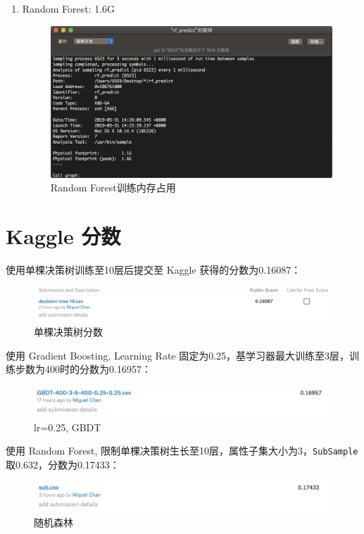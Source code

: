 \documentclass[12pt]{article}
\begin{document}
\begin{enumerate}
    \item Random Forest: 1.6G
    \begin{figure}[H]
        \centering
        \includegraphics[scale=0.44]{rf-memory.png}
        \caption{Random Forest训练内存占用}
        \label{}
    \end{figure}
\end{enumerate}


\section{Kaggle 分数}

使用单棵决策树训练至10层后提交至 Kaggle 获得的分数为0.16087：
\begin{figure}[H]
    \centering
    \includegraphics[scale=0.5]{single-tree-300-10-kaggle.png}
    \caption{单棵决策树分数}
    \label{}
\end{figure}

使用 Gradient Boosting, Learning Rate 固定为0.25，基学习器最大训练至3层，训练步数为400时的分数为0.16957：
\begin{figure}[H]
    \centering
    \includegraphics[scale=0.5]{gbdt-fixed-lr-kaggle.png}
    \caption{lr=0.25, GBDT}
    \label{}
\end{figure}

使用 Random Forest, 限制单棵决策树生长至10层，属性子集大小为3，\lstinline{SubSample}取0.632，分数为0.17433：
\begin{figure}[H]
    \centering
    \includegraphics[scale=0.5]{best.png}
    \caption{随机森林}
    \label{}
\end{figure}



\end{document}
